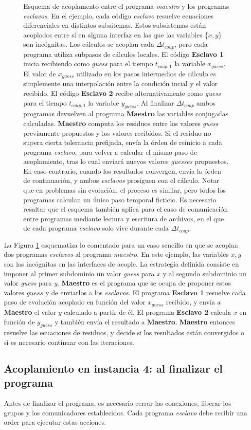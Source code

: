 \begin{figure}
\begin{tikzpicture}
\end{tikzpicture}
\caption[Esquema de acoplamiento implementado]{Esquema de acoplamento entre el programa \textit{maestro} y los programas \textit{esclavos}.
En el ejemplo, cada código \textit{esclavo} resuelve ecuaciones diferenciales en distintos subsitemas.
Estos subsistemas están acoplados entre sí en alguna interfaz en las que las variables \{$x,y$\} son incógnitas.
Los cálculos se acoplan cada $\Delta t_{coup}$, pero cada programa utiliza subpasos de cálculos locales.
El código \textbf{Esclavo 1} inicia recibiendo como \textit{guess} para el tiempo $t_{coup,1}$ la variable $x_{guess}$.
El valor de $x_{guess}$ utilizado en los pasos intermedios de cálculo es simplemente una interpolación entre la condición incial y el valor recibido.
El código \textbf{Esclavo 2} recibe alternativamente como \textit{guess} para el tiempo $t_{coup,1}$ la variable $y_{guess}$.
Al finalizar $\Delta t_{coup}$ ambos programas devuelven al programa \textbf{Maestro} las variables conjugadas calculadas.
\textbf{Maestro} computa los residuos entre los valores \textit{guess} previamente propuestos y los valores recibidos.
Si el residuo no supera cierta tolerancia prefijada, envía la órden de reinicio a cada programa \textit{esclavo}, 
para volver a calcular el mismo paso de acoplamiento, tras lo cual enviará nuevos valores \textit{guesses} propuestos.
En caso contrario, cuando los resultados convergen, envía la órden de continuación, y ambos \textit{esclavos} prosiguen con el cálculo.
Notar que en problemas sin evolución, el proceso es similar, pero todos los programas calculan un único paso temporal ficticio.
Es necesario resaltar que el esquema también aplica para el caso de comunicación entre programas mediante lectura y escritura de archivos, en el que de cada programa \textit{esclavo} solo vive durante cada $\Delta t_{coup}$.
}
\label{esquema-evolucion}
\end{figure}

La Figura \ref{esquema-evolucion} esquematiza lo comentado para un caso sencillo en que se acoplan dos programas \textit{esclavos} al programa \textit{maestro}.
En este ejemplo, las variables $x,y$ son las incógnitas en las interfaces de acople.
La estrategia definida consiste en imponer al primer subdominio un valor \textit{guess} para $x$ y al segundo subdominio un valor \textit{guess} para $y$.
\textbf{Maestro} es el programa que se ocupa de proponer estos valores $guess$ y de enviarlos a los \textit{esclavos}.
El programa \textbf{Esclavo 1} resuelve cada paso de evolución acoplado en función del valor $x_{guess}$ recibido, y envía a \textbf{Maestro} el valor $y$ calculado a partir de él.
El programa \textbf{Esclavo 2} calcula $x$ en función de $y_{guess}$ y también envía el resultado a \textbf{Maestro}.
\textbf{Maestro} entonces resuelve las ecuaciones de residuos, y decide si los resultados están convergidos o si es necesario continuar con las iteraciones.

\subsection*{Acoplamiento en instancia 4: al finalizar el programa}

Antes de finalizar el programa, es necesario cerrar las conexiones, liberar los grupos y los comunicadores establecidos.
Cada programa \textit{esclavo} debe recibir una order para ejecutar estas acciones.
